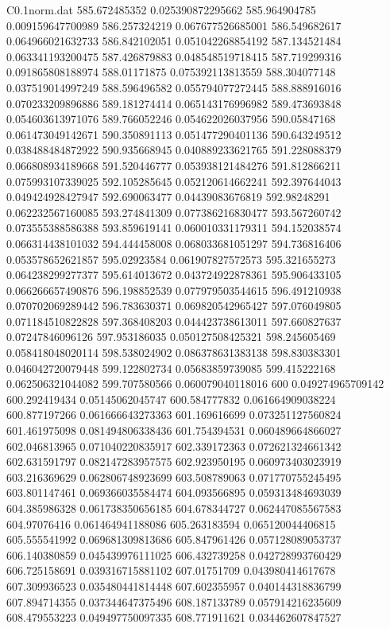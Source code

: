 \begin{filecontents}{C0.1norm.dat}
585.672485352		0.025390872295662
585.964904785		0.009159647700989
586.257324219		0.067677526685001
586.549682617		0.064966021632733
586.842102051		0.051042268854192
587.134521484		0.063341193200475
587.426879883		0.048548519718415
587.719299316		0.091865808188974
588.01171875		0.075392113813559
588.304077148		0.037519014997249
588.596496582		0.055794077272445
588.888916016		0.070233209896886
589.181274414		0.065143176996982
589.473693848		0.054603613971076
589.766052246		0.054622026037956
590.05847168		0.061473049142671
590.350891113		0.051477290401136
590.643249512		0.038488484872922
590.935668945		0.040889233621765
591.228088379		0.066808934189668
591.520446777		0.053938121484276
591.812866211		0.075993107339025
592.105285645		0.052120614662241
592.397644043		0.049424928427947
592.690063477		0.04439083676819
592.98248291		0.062232567160085
593.274841309		0.077386216830477
593.567260742		0.073555388586388
593.859619141		0.060010331179311
594.152038574		0.066314438101032
594.444458008		0.068033681051297
594.736816406		0.053578652621857
595.02923584		0.061907827572573
595.321655273		0.064238299277377
595.614013672		0.043724922878361
595.906433105		0.066266657490876
596.198852539		0.077979503544615
596.491210938		0.070702069289442
596.783630371		0.069820542965427
597.076049805		0.071184510822828
597.368408203		0.044423738613011
597.660827637		0.07247846096126
597.953186035		0.050127508425321
598.245605469		0.058418048020114
598.538024902		0.086378631383138
598.830383301		0.046042720079448
599.122802734		0.05683859739085
599.415222168		0.062506321044082
599.707580566		0.060079040118016
600		0.049274965709142
600.292419434		0.05145062045747
600.584777832		0.061664909038224
600.877197266		0.061666643273363
601.169616699		0.073251127560824
601.461975098		0.081494806338436
601.754394531		0.060489664866027
602.046813965		0.071040220835917
602.339172363		0.072621324661342
602.631591797		0.082147283957575
602.923950195		0.060973403023919
603.216369629		0.062806748923699
603.508789063		0.071770755245495
603.801147461		0.069366035584474
604.093566895		0.059313484693039
604.385986328		0.061738350656185
604.678344727		0.062447085567583
604.97076416		0.061464941188086
605.263183594		0.065120044406815
605.555541992		0.069681309813686
605.847961426		0.057128089053737
606.140380859		0.045439976111025
606.432739258		0.042728993760429
606.725158691		0.039316715881102
607.01751709		0.043980414617678
607.309936523		0.035480441814448
607.602355957		0.040144318836799
607.894714355		0.037344647375496
608.187133789		0.057914216235609
608.479553223		0.049497750097335
608.771911621		0.034462607847527

\end{filecontents}
